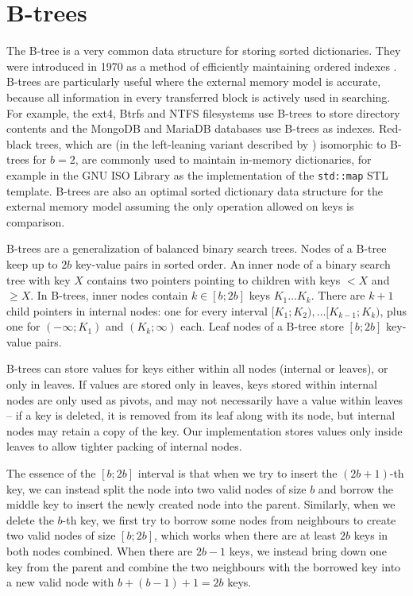 \chapter{B-trees}
\label{chapter:btree}
The B-tree is a very common data structure for storing sorted dictionaries.
They were introduced in 1970 as a method of efficiently maintaining ordered
indexes \cite{btree}.
B-trees are particularly useful where the external memory model is accurate,
because all information in every transferred block is actively used
in searching. For example, the ext4, Btrfs and NTFS filesystems use B-trees
to store directory contents and the MongoDB and MariaDB databases use B-trees
as indexes.  %
Red-black trees, which are (in the left-leaning variant
described by \cite{left-leaning}) isomorphic to B-trees for $b=2$, are
commonly used to maintain in-memory dictionaries, for example in the GNU ISO
\Cpp Library as the implementation of the \texttt{std::map} STL template.
B-trees are also an optimal sorted dictionary data structure
for the external memory model assuming the only operation allowed on
keys is comparison.

B-trees are a generalization of balanced binary search trees.
Nodes of a B-tree keep up to $2b$ key-value pairs in sorted order.
An inner node of a binary search tree with key $X$ contains two pointers
pointing to children with keys $< X$ and $\geq X$. In B-trees,
inner nodes contain $k\in[b;2b]$ keys $K_1\ldots K_k$. There are $k+1$
child pointers in internal nodes: one for every interval
$[K_1;K_2),\ldots [K_{k-1};K_k)$, plus one for $(-\infty;K_1)$ and
$(K_k;\infty)$ each.
Leaf nodes of a B-tree store $[b;2b]$ key-value pairs.

B-trees can store values for keys either within all nodes (internal or leaves),
or only in leaves. If values are stored only in leaves, keys stored
within internal nodes are only used as pivots, and may not necessarily
have a value within leaves -- if a key is deleted, it is removed from its leaf
along with its node, but internal nodes may retain a copy of the key.
Our implementation stores values only inside leaves to allow tighter packing
of internal nodes.

The essence of the $[b;2b]$ interval is that when we try to insert
the $(2b+1)$-th key, we can instead split the node into two valid nodes of size
$b$ and borrow the middle key to insert the newly created node into the parent.
Similarly, when we delete the $b$-th key, we first try to borrow some nodes
from neighbours to create two valid nodes of size $[b;2b]$, which works when
there are at least $2b$ keys in both nodes combined.
When there are $2b-1$ keys, we instead bring down one key from the parent
and combine the two neighbours with the borrowed key into a new valid node with
$b+(b-1)+1=2b$ keys.

